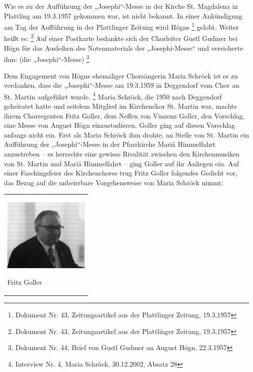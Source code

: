 Wie es zu der Aufführung der „Josephi“-Messe in der Kirche St. Magdalena
in Plattling am 19.3.1957 gekommen war, ist nicht bekannt. In einer
Ankündigung am Tag der Aufführung in der Plattlinger Zeitung wird Högns
 \footnote{Dokument Nr. 43, Zeitungsartikel aus der Plattlinger
Zeitung, 19.3.1957} gelobt. Weiter heißt es:  \footnote{Dokument Nr. 43, Zeitungsartikel aus der
Plattlinger Zeitung, 19.3.1957} Auf einer Postkarte bedankte sich der
Chorleiter Gustl Gudmer bei Högn für das Ausleihen des Notenmaterials
der „Josephi-Messe“ und versicherte ihm: (die
„Josephi“-Messe) \footnote{Dokument Nr.
44, Brief von Gustl Gudmer an August Högn, 22.3.1957}

Dem Engagement von Högns ehemaliger Chorsängerin Maria Schröck ist es zu
verdanken, dass die „Josephi“-Messe am 19.3.1959 in Deggendorf vom Chor
an St. Martin aufgeführt wurde. \footnote{Interview Nr. 4, Maria
Schröck, 30.12.2002, Absatz 28} Maria Schröck, die 1950 nach Deggendorf
geheiratet hatte und seitdem Mitglied im Kirchenchor St. Martin war,
machte ihrem Chorregenten Fritz Goller, dem Neffen von Vinzenz Goller,
den Vorschlag, eine Messe von August Högn einzustudieren. Goller ging
auf diesen Vorschlag anfangs nicht ein. Erst als Maria Schröck ihm
drohte, an Stelle von St. Martin ein Aufführung der „Josephi“-Messe in
der Pfarrkirche Mariä Himmelfahrt anzustreben – es herrschte eine
gewisse Rivalität zwischen den Kirchenmusiken von St. Martin und Mariä
Himmelfahrt – ging Goller auf ihr Anliegen ein. Auf einer
Faschingsfeier des Kirchenchores trug Fritz Goller folgendes Gedicht
vor, das Bezug auf die unbeirrbare Vorgehensweise von Maria Schröck
nimmt:


\begin{center}
\begin{minipage}{4.598cm}
\begin{flushleft}
\tablefirsthead{}
\tablehead{}
\tabletail{}
\tablelasttail{}
\begin{supertabular}{m{4.3980002cm}}

\includegraphics[width=4.216cm,height=3.577cm]{pictures/zulassungsarbeit-img107.jpg}

Fritz Goller \\
\end{supertabular}
\end{flushleft}
\end{minipage}
\end{center}


